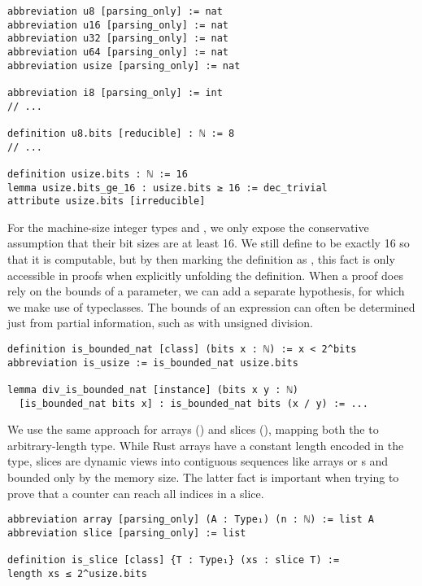 \begin{verbatim}
abbreviation u8 [parsing_only] := nat
abbreviation u16 [parsing_only] := nat
abbreviation u32 [parsing_only] := nat
abbreviation u64 [parsing_only] := nat
abbreviation usize [parsing_only] := nat

abbreviation i8 [parsing_only] := int
// ...

definition u8.bits [reducible] : ℕ := 8
// ...

definition usize.bits : ℕ := 16
lemma usize.bits_ge_16 : usize.bits ≥ 16 := dec_trivial
attribute usize.bits [irreducible]
\end{verbatim}

For the machine-size integer types  and , we only expose
the conservative assumption that their bit sizes are at least 16. We still define
 to be exactly 16 so that it is computable, but by then marking
the definition as \rust{[irreducible]}, this fact is only accessible in proofs
when explicitly unfolding the definition.
When a proof does rely on the bounds of a parameter, we can add a separate
hypothesis, for which we make use of typeclasses. The bounds of an expression
can often be determined just from partial information, such as with unsigned division.

\begin{verbatim}
definition is_bounded_nat [class] (bits x : ℕ) := x < 2^bits
abbreviation is_usize := is_bounded_nat usize.bits

lemma div_is_bounded_nat [instance] (bits x y : ℕ)
  [is_bounded_nat bits x] : is_bounded_nat bits (x / y) := ...
\end{verbatim}

We use the same approach for arrays (\rust{[T; N]}) and slices (\rust{&[T]}),
mapping both the to arbitrary-length  type. While Rust arrays have a
constant length encoded in the type, slices are dynamic views into contiguous sequences
like arrays or s and bounded only by the memory size. The latter fact is important
when trying to prove that a  counter can reach all indices in a slice.

\begin{verbatim}
abbreviation array [parsing_only] (A : Type₁) (n : ℕ) := list A
abbreviation slice [parsing_only] := list

definition is_slice [class] {T : Type₁} (xs : slice T) :=
length xs ≤ 2^usize.bits
\end{verbatim}

